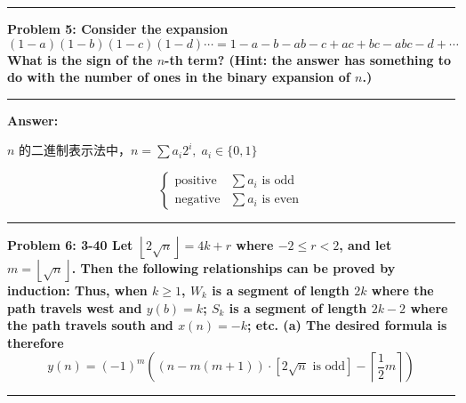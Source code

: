 \documentclass[11pt]{article}
\newcommand\question[2]{\vspace{.25in}\hrule\textbf{#1: #2}\vspace{.5em}\hrule\vspace{.10in}}
\renewcommand\part[1]{\vspace{.10in}\textbf{#1}}
\begin{document}
\question{Problem 5}{Consider the expansion
	$$(1-a)(1-b)(1-c)(1-d) \cdots = 1 - a - b - ab - c + ac + bc - abc - d + \cdots $$
	What is the sign of the $n$-th term? (Hint: the answer has something to do with the number of ones in the binary expansion of $n$.)
}

\part{Answer:}

$n$ 的二進制表示法中，$n = \sum a_i 2^i, \; a_i \in \{0, 1\}$

$$
\begin{cases}
\text{positive} & \sum a_i \text{ is odd} \\
\text{negative} & \sum a_i \text{ is even}
\end{cases}
$$

\question{Problem 6}{3-40 Let $\left \lfloor 2 \sqrt{n} \right \rfloor = 4 k + r$ where $-2 \le r < 2$, and let $m = \left \lfloor \sqrt{n} \right \rfloor$. Then the following relationships can be proved by induction: Thus, when $k \ge 1$, $W_k$ is a segment of length $2k$ where the path travels west and $y(b) = k$; $S_k$ is a segment of length $2k - 2$ where the path travels south and $x(n) = -k$; etc. (a) The desired formula is therefore $$y(n) = (-1)^m \left ( (n - m(m+1)) \cdot \left[ 2 \sqrt{n} \text{ is odd}\right] - \left \lceil \frac{1}{2} m \right \rceil\right )$$
}
\end{document}
